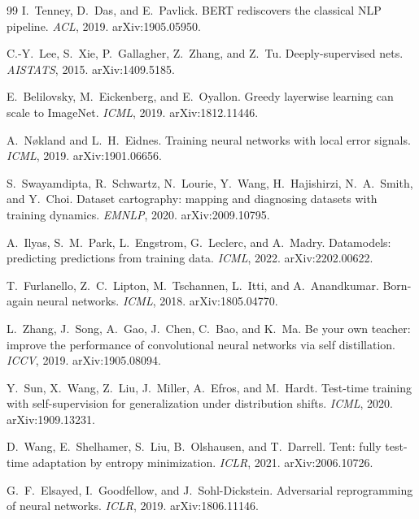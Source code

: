 \documentclass[11pt]{article}
\begin{document}
\begin{thebibliography}{99}
I.~Tenney, D.~Das, and E.~Pavlick.
BERT rediscovers the classical NLP pipeline.
\emph{ACL}, 2019. arXiv:1905.05950.

C.-Y.~Lee, S.~Xie, P.~Gallagher, Z.~Zhang, and Z.~Tu.
Deeply-supervised nets.
\emph{AISTATS}, 2015. arXiv:1409.5185.

E.~Belilovsky, M.~Eickenberg, and E.~Oyallon.
Greedy layerwise learning can scale to ImageNet.
\emph{ICML}, 2019. arXiv:1812.11446.

A.~N{\o}kland and L.~H.~Eidnes.
Training neural networks with local error signals.
\emph{ICML}, 2019. arXiv:1901.06656.

S.~Swayamdipta, R.~Schwartz, N.~Lourie, Y.~Wang,
H.~Hajishirzi, N.~A.~Smith, and Y.~Choi.
Dataset cartography: mapping and diagnosing datasets with
training dynamics.
\emph{EMNLP}, 2020. arXiv:2009.10795.

A.~Ilyas, S.~M.~Park, L.~Engstrom, G.~Leclerc, and A.~Madry.
Datamodels: predicting predictions from training data.
\emph{ICML}, 2022. arXiv:2202.00622.

T.~Furlanello, Z.~C.~Lipton, M.~Tschannen, L.~Itti, and
A.~Anandkumar.
Born-again neural networks.
\emph{ICML}, 2018. arXiv:1805.04770.

L.~Zhang, J.~Song, A.~Gao, J.~Chen, C.~Bao, and K.~Ma.
Be your own teacher: improve the performance of convolutional
neural networks via self distillation.
\emph{ICCV}, 2019. arXiv:1905.08094.

Y.~Sun, X.~Wang, Z.~Liu, J.~Miller, A.~Efros, and M.~Hardt.
Test-time training with self-supervision for generalization
under distribution shifts.
\emph{ICML}, 2020. arXiv:1909.13231.

D.~Wang, E.~Shelhamer, S.~Liu, B.~Olshausen, and T.~Darrell.
Tent: fully test-time adaptation by entropy minimization.
\emph{ICLR}, 2021. arXiv:2006.10726.

G.~F.~Elsayed, I.~Goodfellow, and J.~Sohl-Dickstein.
Adversarial reprogramming of neural networks.
\emph{ICLR}, 2019. arXiv:1806.11146.

\end{thebibliography}
\end{document}
